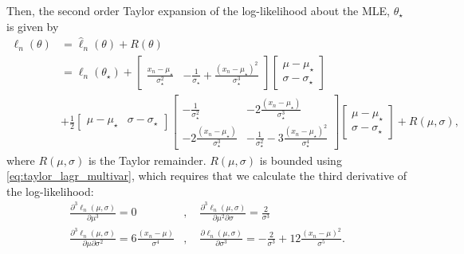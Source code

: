 Then, the second order Taylor expansion of the log-likelihood about the MLE, $\theta_{\star}$ is given by 
\begin{equation}
\begin{split}{}
      \ell_n\left(\theta\right) &= \hat{\ell}_n(\theta) + R(\theta) \\ & = \ell_n\left(\theta_{\star}\right) + \begin{bmatrix} \frac{x_n - \mu_{\star}}{\sigma_{\star}^2}&
-\frac{1}{\sigma_{\star}} + \frac{\left(x_n - \mu_{\star}\right)^2}{\sigma_{\star}^3}\end{bmatrix} \begin{bmatrix} \mu - \mu_{\star} \\   \sigma - \sigma_{\star} \end{bmatrix} \\ &+ \frac{1}{2} \begin{bmatrix} \mu - \mu_{\star} & \sigma - \sigma_{\star} \end{bmatrix} \begin{bmatrix}- \frac{1}{\sigma_{\star}^2} & - 2\frac{\left(x_n - \mu_{\star}\right)}{\sigma_{\star}^3} \\ -2\frac{\left(x_n - \mu_{\star}\right)}{\sigma_{\star}^3} & - \frac{1}{\sigma_{\star}^2} - 3\frac{\left(x_n - \mu_{\star}\right)^2}{\sigma_{\star}^4}\end{bmatrix} \begin{bmatrix} \mu - \mu_{\star} \\   \sigma - \sigma_{\star} \end{bmatrix}   + R(\mu, \sigma), 
\end{split}
\end{equation}
where $R(\mu, \sigma)$ is the Taylor remainder. $R\left(\mu, \sigma\right)$ is bounded using \eqref{eq:taylor_lagr_multivar}, which requires that we calculate the third derivative of the log-likelihood:
\begin{equation*}
\begin{split}
    \frac{\partial^3 \ell_n\left(\mu, \sigma\right)}{\partial\mu^3} = 0 &, \quad \frac{\partial^3\ell_n\left(\mu, \sigma\right)}{\partial\mu^2\partial \sigma} = \frac{2 }{\sigma^3} \\
    \frac{\partial^3\ell_n\left(\mu, \sigma\right)}{\partial\mu\partial\sigma^2} = 6\frac{\left(x_n - \mu \right)}{\sigma^4} &, \quad \frac{\partial \ell_n\left(\mu, \sigma\right)}{\partial\sigma^3} = -\frac{2}{\sigma^3} + 12\frac{\left(x_n - \mu\right)^2}{\sigma^5}. 
    \end{split}
\end{equation*}
